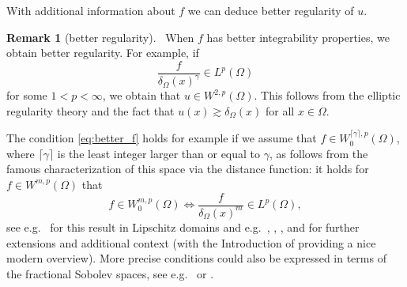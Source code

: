 \documentclass[12pt,a4paper]{amsart}
\theoremstyle{definition}
\newtheorem{remark}[theorem]{\bf Remark}
\begin{document}
With additional information about $f$ we can deduce better regularity of $u$.

\begin{remark}[better regularity]\label{remarkRegularity}\
    When $f$ has better integrability properties, we obtain better regularity. For example, if 
    \begin{equation} \label{eq:better_f}
        \frac{f}{\delta_\Omega(x)^{\gamma}}\in L^p(\Omega)
    \end{equation}
    for some $1<p<\infty$, we obtain that $u\in W^{2,p}(\Omega)$. This follows from the elliptic regularity theory \cite[Theorem~9.15]{MR1814364} and the fact that $u(x)\gtrsim \delta_\Omega(x)$ for all $x\in \Omega$.
    
    The condition \eqref{eq:better_f} holds for example if we assume that $f \in W^{\lceil \gamma \rceil, p}_0(\Omega)$, where $\lceil \gamma \rceil$ is the least integer larger than or equal to $\gamma$, as follows from the famous characterization of this space via the distance function: it holds for $f \in W^{m, p}(\Omega)$ that
    \begin{equation*}
        f \in W^{m,p}_0(\Omega) \iff \frac{f}{\delta_\Omega(x)^{m}}\in L^p(\Omega),
    \end{equation*}    
    see e.g.~\cite[Theorem~1]{KadlecKufner66} for this result in Lipschitz domains and e.g.~\cite{BalinskyEvans15}, \cite[Theorem V.3.4 and Remark~X.6.8]{EdmundsEvans18}, \cite{KinnunenMartio97}, and \cite{NekvindaTurcinova24} for further extensions and additional context (with the Introduction of \cite{NekvindaTurcinova24} providing a nice modern overview). More precise conditions could also be expressed in terms of the fractional Sobolev spaces, see e.g.~\cite[Theorem~3]{MR4454384} or \cite{Kijaczko}.
\end{remark}
\end{document}
